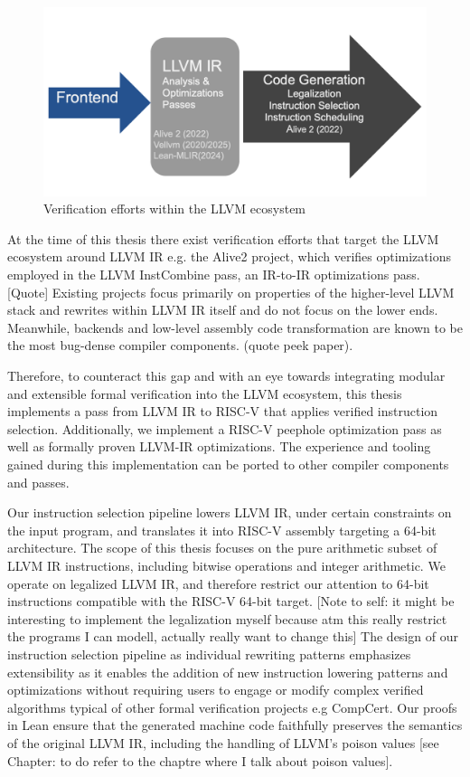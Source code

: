\begin{figure}[htbp]
  \centering
  \includegraphics[scale=0.35]{thesis/verification_efforts_intro.png}
  \caption{Verification efforts within the LLVM ecosystem}
  \label{fig:your-label}
\end{figure}

At the time of this thesis there exist verification efforts that target the LLVM ecosystem around LLVM IR e.g. the Alive2 project, which verifies optimizations employed in the LLVM InstCombine pass, an IR-to-IR optimizations pass. [Quote]
Existing projects focus primarily on properties of the higher-level LLVM stack and rewrites within LLVM IR itself and do not focus on the lower ends. Meanwhile, backends and low-level assembly code transformation are known to be the most bug-dense compiler components. (quote peek paper). 

Therefore, to counteract this gap and with an eye towards integrating modular and extensible formal verification into the LLVM ecosystem, this thesis implements a pass from LLVM IR to RISC-V that applies verified instruction selection. Additionally, we implement a RISC-V peephole optimization pass as well as formally proven LLVM-IR optimizations. The experience and tooling gained during this implementation can be ported to other compiler components and passes.

Our instruction selection pipeline lowers LLVM IR, under certain constraints on the input program, and translates it into RISC-V assembly targeting a 64-bit architecture. The scope of this thesis focuses on the pure arithmetic subset of LLVM IR instructions, including bitwise operations and integer arithmetic. We operate on legalized LLVM IR, and therefore restrict our attention to 64-bit instructions compatible with the RISC-V 64-bit target.
[Note to self: it might be interesting to implement the legalization myself because atm this really restrict the programs I can modell, actually really want to change this]
The design of our instruction selection pipeline as individual rewriting patterns emphasizes extensibility as it enables the addition of new instruction lowering patterns and optimizations without requiring users to engage or modify complex verified algorithms typical of other formal verification projects e.g CompCert. 
Our proofs in Lean ensure that the generated machine code faithfully preserves the semantics of the original LLVM IR, including the handling of LLVM’s poison values [see Chapter: to do refer to the chaptre where I talk about poison values].

